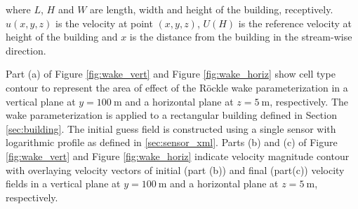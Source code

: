 where $L$, $H$ and $W$ are length, width and height of the building, receptively. $u(x,y,z)$ is the velocity at point $(x,y,z)$, $U(H)$ is the reference velocity at height of the building and $x$ is the distance from the building in the stream-wise direction.

Part (a) of Figure \ref{fig:wake_vert} and Figure \ref{fig:wake_horiz} show cell type contour to represent the area of effect of the R\"{o}ckle wake parameterization in a vertical plane at $y=100\ \si{\meter}$ and a horizontal plane at $z=5\ \si{\meter}$, respectively. The wake parameterization is applied to a rectangular building defined in Section \ref{sec:building}. The initial guess field is constructed using a single sensor with logarithmic profile as defined in \ref{sec:sensor_xml}. Parts (b) and (c) of Figure \ref{fig:wake_vert} and Figure \ref{fig:wake_horiz} indicate velocity magnitude contour with overlaying velocity vectors of initial (part (b)) and final (part(c)) velocity fields in a vertical plane at $y=100\ \si{\meter}$ and a horizontal plane at $z=5\ \si{\meter}$, respectively.

